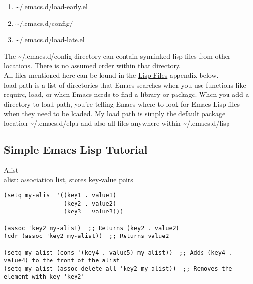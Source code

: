 \documentclass{article}
\begin{document}
\begin{enumerate}
\item \textasciitilde{}/.emacs.d/load-early.el\\[0pt]
\item \textasciitilde{}/.emacs.d/config/\\[0pt]
\item \textasciitilde{}/.emacs.d/load-late.el\\[0pt]
\end{enumerate}

The \textasciitilde{}/.emacs.d/config directory can contain symlinked lisp files from other locations. There is no assumed order within that directory.\\[0pt]

All files mentioned here can be found in the \hyperref[sec:org7c6821c]{Lisp Files} appendix below.\\[0pt]

load-path is a list of directories that Emacs searches when you use functions like require, load, or when Emacs needs to find a library or package. When you add a directory to load-path, you're telling Emacs where to look for Emacs Lisp files when they need to be loaded. My load path is simply the default package location \textasciitilde{}/.emacs.d/elpa and also all files anywhere within \textasciitilde{}/.emacs.d/lisp\\[0pt]
\subsection{Simple Emacs Lisp Tutorial}
\label{sec:org6296f92}
Alist\\[0pt]



alist: association list, stores key-value pairs\\[0pt]
\begin{verbatim}
(setq my-alist '((key1 . value1)
                 (key2 . value2)
                 (key3 . value3)))

(assoc 'key2 my-alist)  ;; Returns (key2 . value2)
(cdr (assoc 'key2 my-alist))  ;; Returns value2

(setq my-alist (cons '(key4 . value5) my-alist))  ;; Adds (key4 . value4) to the front of the alist
(setq my-alist (assoc-delete-all 'key2 my-alist))  ;; Removes the element with key 'key2'

\end{verbatim}
\end{document}
